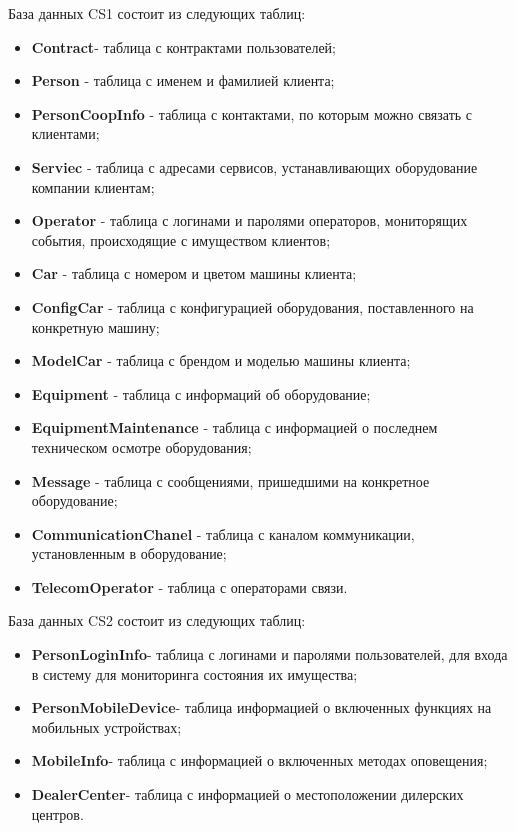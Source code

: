 \newpage
\vspace{0.5cm}
База данных CS1 состоит из следующих таблиц:
\begin{itemize}
	\item \textbf{Contract}- таблица с контрактами пользователей;
	\item \textbf{Person} - таблица с именем и фамилией клиента;
	\item \textbf{PersonCoopInfo} - таблица с контактами, по которым можно связать с клиентами;
	\item \textbf{Serviec} - таблица с адресами сервисов, устанавливающих оборудование компании клиентам;
	\item \textbf{Operator} - таблица с логинами и паролями операторов, мониторящих события, происходящие с имуществом клиентов;
	\item \textbf{Car} - таблица с номером и цветом машины клиента;
	\item \textbf{ConfigCar} - таблица с конфигурацией оборудования, поставленного на конкретную машину;
	\item \textbf{ModelCar} - таблица с брендом и моделью машины клиента;
	\item \textbf{Equipment} -  таблица с информаций об оборудование;
	\item \textbf{EquipmentMaintenance} - таблица с информацией о последнем техническом осмотре оборудования;
	\item \textbf{Message} - таблица с сообщениями, пришедшими на конкретное оборудование;
	\item \textbf{CommunicationChanel} - таблица с каналом коммуникации, установленным в оборудование;
	\item \textbf{TelecomOperator} - таблица с операторами связи.
	
\end{itemize}

\vspace{0.5cm}
База данных CS2 состоит из следующих таблиц:
\begin{itemize}
	\item \textbf{PersonLoginInfo}- таблица с логинами и паролями пользователей, для входа в систему для мониторинга состояния их имущества;
	\item \textbf{PersonMobileDevice}- таблица информацией о включенных функциях на мобильных устройствах;
	\item \textbf{MobileInfo}- таблица с информацией о включенных методах оповещения;
	\item \textbf{DealerCenter}- таблица с информацией о местоположении дилерских центров.
\end{itemize}

